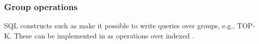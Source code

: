 %
%
%
%
%
%
%

\subsubsection{Group operations}

SQL constructs such as  make it possible to
write queries over groups, e.g., TOP-K.  These can be implemented in
\dbsp as operations over indexed \zrs.

